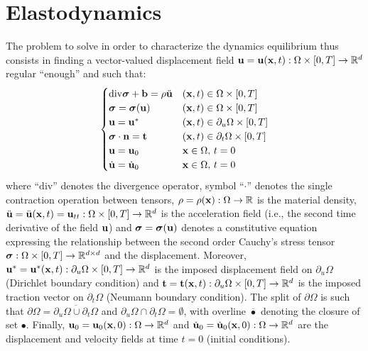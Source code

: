 \documentclass{report}
\newcommand{\bx}{\textbf{x}}
\newcommand{\bb}{\textbf{b}}
\newcommand{\bu}{\textbf{u}}
\newcommand{\bt}{\boldsymbol t}
\def\bsigma{\mbox{\boldmath${\sigma}$}}
\def\bb{{\bf{b}}}
\def\bn{{\bf{n}}}
\def\bx{{\bf{x}}}
\def\bt{{\bf t}}
\def\bu{{\bf{u}}}
\begin{document}
\section{Elastodynamics}

The problem to solve in order to characterize the dynamics equilibrium thus consists in finding a vector-valued displacement field $\bu=\bu(\bx,t):\Omega\times[0,T]\to\mathbb{R}^{d}$
regular ``enough'' and such that: 
\begin{equation}
\begin{cases}
\mathrm{\mathrm{div}}\bsigma+\bb=\rho\ddot{\bu} & (\bx,t)\in\Omega\times[0,T]\\
\bsigma=\bsigma(\bu) & (\bx,t)\in\Omega\times[0,T]\\
\bu=\bu^{*} & (\bx,t)\in\partial_{u}\Omega\times[0,T]\\
\bsigma\cdot\bn=\bt & (\bx,t)\in\partial_{t}\Omega\times[0,T]\\
\bu=\bu_{0} & \bx\in\Omega,\,t=0\\
\dot{\bu}=\dot{\bu}_{0} & \bx\in\Omega,\,t=0
\end{cases}
\end{equation}
where ``$\mathrm{\mathrm{div}}$'' denotes the divergence operator, symbol ``$\cdot$'' denotes the single contraction operation between tensors, $\rho=\rho(\bx):\Omega\to\mathbb{R}$ is the material density,
$\ddot{\bu}=\ddot{\bu}(\bx,t)=\bu_{tt}:\Omega\times[0,T]\to\mathbb{R}^{d}$ is the acceleration field (i.e., the second time derivative of the field $\bu$) and $\bsigma=\bsigma(\bu)$ denotes a constitutive equation
expressing the relationship between the second order Cauchy's stress tensor $\bsigma:\Omega\times[0,T]\to\mathbb{R}^{d\times d}$ and the displacement. Moreover, $\bu^{*}=\bu^{*}(\bx,t):\partial_{u}\Omega\times[0,T]\to\mathbb{R}^{d}$ is the imposed displacement field on $\partial_{u}\Omega$ (Dirichlet
boundary condition) and 
$\bt=\bt(\bx,t):\partial_{u}\Omega\times[0,T]\to\mathbb{R}^{d}$
is the imposed traction vector on $\partial_{t}\Omega$ (Neumann boundary condition). The split of $\partial\Omega$ is such that $\partial\Omega=\overline{\partial_{u}\Omega\cup\partial_{t}\Omega}$ and $\partial_{u}\Omega\cap\partial_{t}\Omega=\emptyset$, with overline $\overline{\bullet}$ denoting the closure of set $\bullet$. Finally,
$\bu_{0}=\bu_{0}(\bx,0):\Omega\to\mathbb{R}^{d}$ and $\dot{\bu}_{0}=\dot{\bu}_{0}(\bx,0):\Omega\to\mathbb{R}^{d}$
are the displacement and velocity fields at time $t=0$ (initial conditions).
\end{document}
